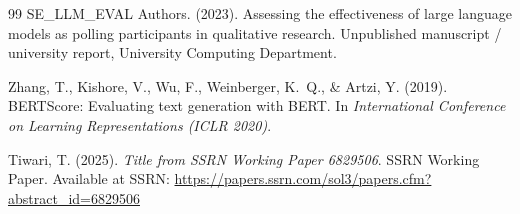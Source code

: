 \documentclass[11pt,a4paper]{article}
\begin{document}
\begin{thebibliography}{99}
SE\_LLM\_EVAL Authors. (2023).
\newblock Assessing the effectiveness of large language models as polling
participants in qualitative research.
\newblock Unpublished manuscript / university report, University Computing
Department.

Zhang, T., Kishore, V., Wu, F., Weinberger, K.~Q., \& Artzi, Y. (2019).
\newblock BERTScore: Evaluating text generation with BERT.
\newblock In \emph{International Conference on Learning Representations (ICLR
2020)}.

Tiwari, T. (2025).
\newblock \emph{Title from SSRN Working Paper 6829506}.
\newblock SSRN Working Paper.
\newblock Available at SSRN: \url{https://papers.ssrn.com/sol3/papers.cfm?abstract_id=6829506}

\end{thebibliography}
\end{document}
